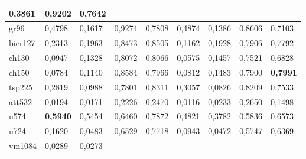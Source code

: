 \begin{table}[htb]
{\begin{tabular}{|l|llll|llll|}
    \multicolumn{1}{l|}{0,3861 } &
    \multicolumn{1}{l|}{\textbf{0,9202} } &
    0,7642  \\ \hline
  gr96 &
    \multicolumn{1}{l|}{0,4798 } &
    \multicolumn{1}{l|}{0,1617 } &
    \multicolumn{1}{l|}{0,9274 } &
    0,7808  &
    \multicolumn{1}{l|}{0,4874 } &
    \multicolumn{1}{l|}{0,1386 } &
    \multicolumn{1}{l|}{0,8606 } &
    0,7103  \\ \hline
  bier127 &
    \multicolumn{1}{l|}{0,2313 } &
    \multicolumn{1}{l|}{0,1963 } &
    \multicolumn{1}{l|}{0,8473 } &
    0,8505  &
    \multicolumn{1}{l|}{0,1162 } &
    \multicolumn{1}{l|}{0,1928 } &
    \multicolumn{1}{l|}{0,7906 } &
    0,7792  \\ \hline
  ch130 &
    \multicolumn{1}{l|}{0,0947 } &
    \multicolumn{1}{l|}{0,1328 } &
    \multicolumn{1}{l|}{0,8072 } &
    0,8066  &
    \multicolumn{1}{l|}{0,0575 } &
    \multicolumn{1}{l|}{0,1457 } &
    \multicolumn{1}{l|}{0,7521 } &
    0,6828  \\ \hline
  ch150 &
    \multicolumn{1}{l|}{0,0784 } &
    \multicolumn{1}{l|}{0,1140 } &
    \multicolumn{1}{l|}{0,8584 } &
    0,7966  &
    \multicolumn{1}{l|}{0,0812 } &
    \multicolumn{1}{l|}{0,1483 } &
    \multicolumn{1}{l|}{0,7900 } &
    \textbf{0,7991 } \\ \hline
  tsp225 &
    \multicolumn{1}{l|}{0,2819 } &
    \multicolumn{1}{l|}{0,0988 } &
    \multicolumn{1}{l|}{0,7801 } &
    0,8311  &
    \multicolumn{1}{l|}{0,3057 } &
    \multicolumn{1}{l|}{0,0826 } &
    \multicolumn{1}{l|}{0,8209 } &
    0,7533  \\ \hline
  att532 &
    \multicolumn{1}{l|}{0,0194 } &
    \multicolumn{1}{l|}{0,0171 } &
    \multicolumn{1}{l|}{0,2226 } &
    0,2470  &
    \multicolumn{1}{l|}{0,0116 } &
    \multicolumn{1}{l|}{0,0233 } &
    \multicolumn{1}{l|}{0,2650 } &
    0,1498  \\ \hline
  u574 &
    \multicolumn{1}{l|}{\textbf{0,5940}} &
    \multicolumn{1}{l|}{0,5454 } &
    \multicolumn{1}{l|}{0,6460 } &
    0,7872  &
    \multicolumn{1}{l|}{0,4821 } &
    \multicolumn{1}{l|}{0,3782 } &
    \multicolumn{1}{l|}{0,5836 } &
    0,6573  \\ \hline
  u724 &
    \multicolumn{1}{l|}{0,1620 } &
    \multicolumn{1}{l|}{0,0483 } &
    \multicolumn{1}{l|}{0,6529 } &
    0,7718  &
    \multicolumn{1}{l|}{0,0943 } &
    \multicolumn{1}{l|}{0,0472 } &
    \multicolumn{1}{l|}{0,5747 } &
    0,6369  \\ \hline
  vm1084 &
    \multicolumn{1}{l|}{0,0289 } &
    \multicolumn{1}{l|}{0,0273 } &

\end{tabular}}
\end{table}
